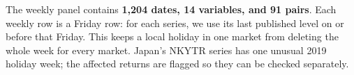 The weekly panel contains \textbf{1,204 dates, 14 variables, and 91 pairs}. Each weekly row is a Friday row: for each series, we use its last published level on or before that Friday. This keeps a local holiday in one market from deleting the whole week for every market. Japan's NKYTR series has one unusual 2019 holiday week; the affected returns are flagged so they can be checked separately.

